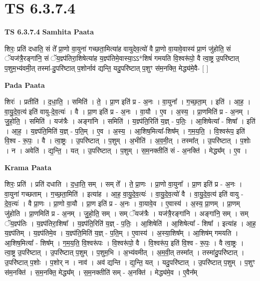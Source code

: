 \documentclass[17pt]{extarticle}
\begin{document}
\section{ TS 6.3.7.4 }

\textbf{TS 6.3.7.4 } \newline
\textbf{Samhita Paata} \newline

शिरः॒ प्रति॑ दधाति॒ सं ते᳚ प्रा॒णो वा॒युना॑ गच्छता॒मित्या॑ह वायुदेव॒त्यो॑ वै प्रा॒णो वा॒यावे॒वास्य॑ प्रा॒णं जु॑होति॒ सं ॅयज॑त्रै॒रङ्गा॑नि॒ सं ॅय॒ज्ञ्प॑तिरा॒शिषेत्या॑ह य॒ज्ञ्प॑तिमे॒वास्या॒ऽऽ*शिषं॑ गमयति वि॒श्वरू॑पो॒ वै त्वा॒ष्ट्र उ॒परि॑ष्टात् प॒शुम॒भ्य॑वमी॒त् तस्मा॑-दु॒परि॑ष्टात् प॒शोर्नाव॑ द्यन्ति॒ यदु॒परि॑ष्टात् प॒शुꣳ स॑म॒नक्ति॒ मेद्ध्य॑मे॒वै- [  ] \newline

\textbf{Pada Paata} \newline

शिरः॑ । प्रतीति॑ । द॒धा॒ति॒ । समिति॑ । ते॒ । प्रा॒ण इति॑ प्र - अ॒नः । वा॒युना᳚ । ग॒च्छ॒ता॒म् । इति॑ । आ॒ह॒ । वा॒यु॒दे॒व॒त्य॑ इति॑ वायु-दे॒व॒त्यः॑ । वै । प्रा॒ण इति॑ प्र - अ॒नः । वा॒यौ । ए॒व । अ॒स्य॒ । प्रा॒णमिति॑ प्र - अ॒नम् । जु॒हो॒ति॒ । समिति॑ । यज॑त्रैः । अङ्गा॑नि । समिति॑ । य॒ज्ञ्प॑ति॒रिति॑ य॒ज्ञ् - प॒तिः॒ । आ॒शिषेत्या᳚ - शिषा᳚ । इति॑ । आ॒ह॒ । य॒ज्ञ्प॑ति॒मिति॑ य॒ज्ञ् - प॒ति॒म् । ए॒व । अ॒स्य॒ । आ॒शिष॒मित्या᳚-शिष᳚म् । ग॒म॒य॒ति॒ । वि॒श्वरू॑प॒ इति॑ वि॒श्व - रू॒पः॒ । वै । त्वा॒ष्ट्रः । उ॒परि॑ष्टात् । प॒शुम् । अ॒भीति॑ । अ॒व॒मी॒त् । तस्मा᳚त् । उ॒परि॑ष्टात् । प॒शोः । न । अवेति॑ । द्य॒न्ति॒ । यत् । उ॒परि॑ष्टात् । प॒शुम् । स॒म॒नक्तीति॑ सं - अ॒नक्ति॑ । मेद्ध्य᳚म् । ए॒व ।  \newline


\textbf{Krama Paata} \newline

शिरः॒ प्रति॑ । प्रति॑ दधाति । द॒धा॒ति॒ सम् । सम् ते᳚ । ते॒ प्रा॒णः । प्रा॒णो वा॒युना᳚ । प्रा॒ण इति॑ प्र - अ॒नः । वा॒युना॑ गच्छताम् । ग॒च्छ॒ता॒मिति॑ । इत्या॑ह । आ॒ह॒ वा॒यु॒दे॒व॒त्यः॑ । वा॒यु॒दे॒व॒त्यो॑ वै । वा॒यु॒दे॒व॒त्य॑ इति॑ वायु - दे॒व॒त्यः॑ । वै प्रा॒णः । प्रा॒णो वा॒यौ । प्रा॒ण इति॑ प्र - अ॒नः । वा॒यावे॒व । ए॒वास्य॑ । अ॒स्य॒ प्रा॒णम् । प्रा॒णम् जु॑होति । प्रा॒णमिति॑ प्र - अ॒नम् । जु॒हो॒ति॒ सम् । सम् ॅयज॑त्रैः । यज॑त्रै॒रङ्‍गा॑नि । अङ्‍गा॑नि॒ सम् । सम् ॅय॒ज्ञ्प॑तिः । य॒ज्ञ्प॑तिरा॒शिषा᳚ । य॒ज्ञ्प॑ति॒रिति॑ य॒ज्ञ् - प॒तिः॒ । आ॒शिषेति॑ । आ॒शिषेत्या᳚ - शिषा᳚ । इत्या॑ह । आ॒ह॒ य॒ज्ञ्प॑तिम् । य॒ज्ञ्प॑तिमे॒व । य॒ज्ञ्प॑ति॒मिति॑ य॒ज्ञ् - प॒ति॒म् । ए॒वास्य॑ । अ॒स्या॒शिष᳚म् । आ॒शिष॑म् गमयति । आ॒शिष॒मित्या᳚ - शिष᳚म् । ग॒म॒य॒ति॒ वि॒श्वरू॑पः । वि॒श्वरू॑पो॒ वै । वि॒श्वरू॑प॒ इति॑ वि॒श्व - रू॒पः॒ । वै त्वा॒ष्ट्रः । त्वा॒ष्ट्र उ॒परि॑ष्टात् । उ॒परि॑ष्टात् प॒शुम् । प॒शुम॒भि । अ॒भ्य॑वमीत् । अ॒म॒वी॒त् तस्मा᳚त् । तस्मा॑दु॒परि॑ष्टात् । उ॒परि॑ष्टात् प॒शोः । प॒शोर् न । नाव॑ । अव॑ द्यन्ति । द्य॒न्ति॒ यत् । यदु॒परि॑ष्टात् । उ॒परि॑ष्टात् प॒शुम् । प॒शुꣳ स॑म॒नक्ति॑ । स॒म॒नक्ति॒ मेद्ध्य᳚म् । स॒म॒नक्तीति॑ सम् - अ॒नक्ति॑ । मेद्ध्य॑मे॒व । ए॒वैन᳚म् \newline
\end{document}
